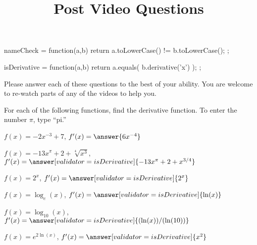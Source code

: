 \documentclass[handout]{ximera}
\title{Post Video Questions}
\begin{document}
\begin{abstract}
\end{abstract}


\maketitle

\begin{javascript}
nameCheck = function(a,b) {
    return a.toLowerCase() != b.toLowerCase();
  };

isDerivative = function(a,b) {
    return a.equals( b.derivative('x') );
  };

\end{javascript}

Please answer each of these questions to the best of your ability. You are welcome to re-watch parts of any of the videos to help you.

For each of the following functions, find the derivative function. To enter the number $\pi$, type ``pi.''

\begin{problem}
$f(x)=-2x^{-3}+7$, $f'(x)=\answer{6x^{-4}}$
\end{problem}

\begin{problem}
$f(x)=-13 x^{\pi}+2+\sqrt[4]{x^3}$, $f'(x)=\answer[validator=isDerivative]{-13 x^{\pi} + 2 + x^{3/4}}$
\end{problem}

\begin{problem}
$f(x)= 2^x$, $f'(x)=\answer[validator=isDerivative]{2^x}$
\end{problem}

\begin{problem}
$f(x)=\log_e(x)$, $f'(x)=\answer[validator=isDerivative]{\ln(x)}$
\end{problem}

\begin{problem}
$f(x)=\log_{10}(x)$, $f'(x)=\answer[validator=isDerivative]{(\ln(x))/(\ln(10))}$
\end{problem}

\begin{problem}
$f(x)=e^{2\ln(x)}$, $f'(x)=\answer[validator=isDerivative]{x^2}$
\end{problem}
\end{document}
